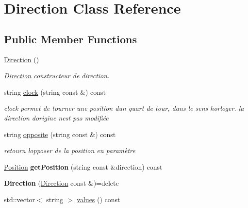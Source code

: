 \hypertarget{class_direction}{}\section{Direction Class Reference}
\label{class_direction}
\subsection*{Public Member Functions}
\begin{DoxyCompactItemize}
\item 
\mbox{\label{class_direction_aba0c848f9db9831e6feb64d978e6d019}} 
\mbox{\hyperlink{class_direction_aba0c848f9db9831e6feb64d978e6d019}{Direction}} ()
\begin{DoxyCompactList}\small\item\em \mbox{\hyperlink{class_direction}{Direction}} constructeur de direction. \end{DoxyCompactList}\item 
string \mbox{\hyperlink{class_direction_a89840cc08c0d1e1910a1ce32ab81a42e}{clock}} (string const \&) const
\begin{DoxyCompactList}\small\item\em clock permet de tourner une position d\textquotesingle{}un quart de tour, dans le sens horloger. la direction d\textquotesingle{}origine n\textquotesingle{}est pas modifiée \end{DoxyCompactList}\item 
string \mbox{\hyperlink{class_direction_aca966ec39d7529ca7be6a0073f0d3710}{opposite}} (string const \&) const
\begin{DoxyCompactList}\small\item\em retourn l\textquotesingle{}opposer de la position en paramètre \end{DoxyCompactList}\item 
\mbox{\label{class_direction_a055bf00fa183b17ac2aa4202915d9a71}} 
\mbox{\hyperlink{class_position}{Position}} {\bfseries get\+Position} (string const \&direction) const
\item 
\mbox{\label{class_direction_a7daa0dcdcc06841891a830b7f2bd4956}} 
{\bfseries Direction} (\mbox{\hyperlink{class_direction}{Direction}} const \&)=delete
\item 
std\+::vector$<$ string $>$ \mbox{\hyperlink{class_direction_a48435a79df040ca9a5111c45ed26e9ec}{values}} () const

\end{DoxyCompactItemize}

